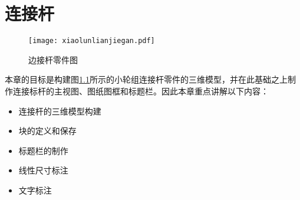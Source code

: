 \chapter{连接杆}
\begin{figure}[htbp]
\centering
\texttt{[image: xiaolunlianjiegan.pdf]}
\caption{边接杆零件图}\label{fig:xiaolunlianjiegan}
\end{figure}

本章的目标是构建图\ref{fig:xiaolunlianjiegan}所示的小轮组连接杆零件的三维模型，并在此基础之上制作连接标杆的主视图、图纸图框和标题栏。因此本章重点讲解以下内容：
\begin{itemize}
\item 连接杆的三维模型构建
\item 块的定义和保存
\item 标题栏的制作
\item 线性尺寸标注
\item 文字标注
\end{itemize}




%
\endinput